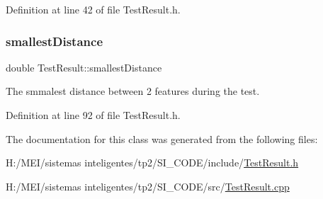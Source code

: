 Definition at line 42 of file Test\+Result.\+h.

\mbox{\label{class_test_result_a9a58045656cd237ce1231b15b234f2c3}} 
\subsubsection{\texorpdfstring{smallest\+Distance}{smallestDistance}}
{\footnotesize\ttfamily double Test\+Result\+::smallest\+Distance\hspace{0.3cm}{\ttfamily [protected]}}

The smmalest distance between 2 features during the test. 

Definition at line 92 of file Test\+Result.\+h.



The documentation for this class was generated from the following files\+:\begin{DoxyCompactItemize}
\item 
H\+:/\+M\+E\+I/sistemas inteligentes/tp2/\+S\+I\+\_\+\+C\+O\+D\+E/include/\hyperlink{_test_result_8h}{Test\+Result.\+h}\item 
H\+:/\+M\+E\+I/sistemas inteligentes/tp2/\+S\+I\+\_\+\+C\+O\+D\+E/src/\hyperlink{_test_result_8cpp}{Test\+Result.\+cpp}\end{DoxyCompactItemize}
